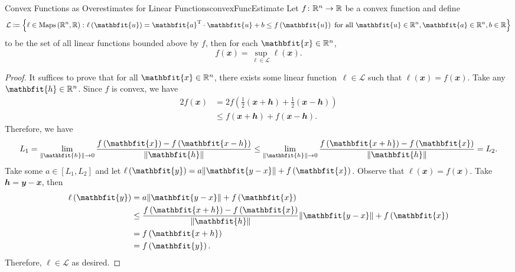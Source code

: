 \documentclass[math]{amznotes}
\theoremstyle{remark}
\begin{document}
\begin{probox}{Convex Functions as Overestimates for Linear Functions}{convexFuncEstimate}
    Let $f \colon \mathbb{R}^n \to \mathbb{R}$ be a convex function and define 
    \begin{equation*}
        \mathcal{L} \coloneqq \left\{\ell \in \mathrm{Maps}\left(\R^n, \R\right) \colon \ell\left(\mathbfit{u}\right) = \mathbfit{a}^{\mathrm{T}} \cdot \mathbfit{u} + b \leq f\left(\mathbfit{u}\right) \textrm{ for all } \mathbfit{u} \in \R^n, \mathbfit{a} \in \R^n, b \in \R\right\}
    \end{equation*}
    to be the set of all linear functions bounded above by $f$, then for each $\mathbfit{x} \in \R^n$, 
    \begin{equation*}
        f\left(\mathbfit{x}\right) = \sup_{\ell \in \mathcal{L}}\ell\left(\mathbfit{x}\right).
    \end{equation*}
    \tcblower
    \begin{proof}
        It suffices to prove that for all $\mathbfit{x} \in \R^n$, there exists some linear function~$\ell \in \mathcal{L}$ such that $\ell\left(\mathbfit{x}\right) = f\left(\mathbfit{x}\right)$. Take any $\mathbfit{h} \in \R^n$. Since $f$ is convex, we have 
        \begin{align*}
            2f\left(\mathbfit{x}\right) & = 2f\left(\frac{1}{2}\left(\mathbfit{x + h}\right) + \frac{1}{2}\left(\mathbfit{x - h}\right)\right) \\
            & \leq f\left(\mathbfit{x + h}\right) + f\left(\mathbfit{x - h}\right).
        \end{align*}
        Therefore, we have
        \begin{equation*}
            L_1 = \lim_{\norm{\mathbfit{h}} \to 0}\frac{f\left(\mathbfit{x}\right) - f\left(\mathbfit{x - h}\right)}{\norm{\mathbfit{h}}} \leq \lim_{\norm{\mathbfit{h}} \to 0}\frac{f\left(\mathbfit{x + h}\right) - f\left(\mathbfit{x}\right)}{\norm{\mathbfit{h}}} = L_2.
        \end{equation*}
        Take some $a \in [L_1, L_2]$ and let $\ell\left(\mathbfit{y}\right) = a\norm{\mathbfit{y - x}} + f\left(\mathbfit{x}\right)$. Observe that $\ell\left(\mathbfit{x}\right) = f\left(\mathbfit{x}\right)$. Take $\mathbfit{h} = \mathbfit{y - x}$, then 
        \begin{align*}
            \ell\left(\mathbfit{y}\right) & = a\norm{\mathbfit{y - x}} + f\left(\mathbfit{x}\right) \\
            & \leq \frac{f\left(\mathbfit{x + h}\right) - f\left(\mathbfit{x}\right)}{\norm{\mathbfit{h}}}\norm{\mathbfit{y - x}} + f\left(\mathbfit{x}\right) \\
            & = f\left(\mathbfit{x + h}\right) \\
            & = f\left(\mathbfit{y}\right).
        \end{align*} 
        Therefore, $\ell \in \mathcal{L}$ as desired.
    \end{proof}
\end{probox}
\end{document}
